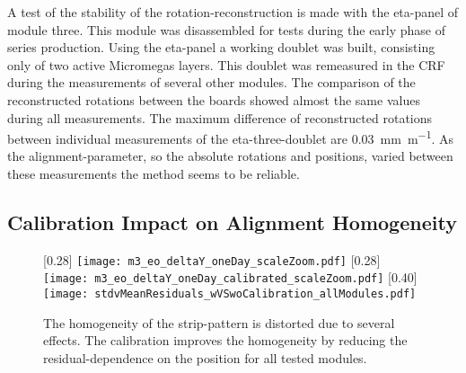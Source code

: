 \documentclass[
twoside,            %
BCOR1.4cm,          %
10pt,               %
headings=normal,    %
headsepline,        %
clearplainpage,		%
final,              %
div=14,
open=right,
bibliography=toc
]{scrreprt}
\begin{document}
A test of the stability of the rotation-reconstruction is made with the eta-panel of module three.
This module was disassembled for tests during the early phase of series production.
Using the eta-panel a working doublet was built, consisting only of two active Micromegas layers.
This doublet was remeasured in the CRF during the measurements of several other modules.
The comparison of the reconstructed rotations between the boards showed almost the same values during all measurements.
The maximum difference of reconstructed rotations between individual measurements of the eta-three-doublet are \SI{0.03}{\mm\per\m}.
As the alignment-parameter, so the absolute rotations and positions, varied between these measurements the method seems to be reliable.

\subsection{Calibration Impact on Alignment Homogeneity}\label{alignmentHomogeneity}

\begin{figure}[!h]
	\centering
	[0.28\textwidth]
	{\texttt{[image: m3\_eo\_deltaY\_oneDay\_scaleZoom.pdf]}}
	\hfill
	[0.28\textwidth]
		{\texttt{[image: m3\_eo\_deltaY\_oneDay\_calibrated\_scaleZoom.pdf]}}
	\hfill
	[0.40\textwidth]
	{\texttt{[image: stdvMeanResiduals\_wVSwoCalibration\_allModules.pdf]}}
	\vspace{-2mm}
	\caption{
		The homogeneity of the strip-pattern is distorted due to several effects.
		The calibration improves the homogeneity by reducing the residual-dependence on the position for all tested modules.
	}
	\label{alignmentCalibrationEffect}
	\vspace{-2mm}
\end{figure}
\end{document}
